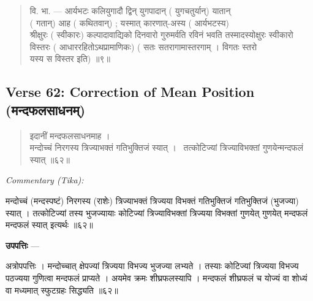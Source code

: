 \documentclass[11pt,a4paper]{article}
\newcommand{\dev}[1]{{\devanagarifont #1}}
\newcommand{\skt}[1]{{\devanagarifont\color{sktcolor} #1}}
\newenvironment{shloka}{%
  \begin{quote}%
  \smallskip%
  \devanagarifont\color{sktcolor}%
}{%
  \smallskip%
  \end{quote}%
}
\newenvironment{tika}{%
  \smallskip%
  \noindent\textit{Commentary (Tika):}\par%
  \smallskip%
  \hindifont\small%
}{%
  \par\smallskip%
}
\newenvironment{upapatti}{%
  \smallskip%
  \noindent\textbf{\devanagarifont उपपत्तिः} — \devanagarifont\small%
}{%
  \par\smallskip%
}
\begin{document}
\vspace{0.5cm}

\begin{shloka}
\skt{वि. भा. — आर्यभटः कलियुगादौ द्विन् युगपादान्} (\skt{युगचतुर्यान्}) \skt{यातान्}\\
(\skt{गतान्}) \skt{आह} (\skt{कथितवान्})\skt{; यस्मात् कारणात्-अस्य} (\skt{आर्यभटस्य})\\
\skt{श्रीक्षुरः} (\skt{स्वीकारः}) \skt{कल्पादावाद्यिको दिनवारो गुरुमर्वति रविनं भवति तस्मादस्योक्षुरः स्वीकारो}\\
\skt{विस्तरः} (\skt{आधाररहितोऽथप्रामाणिकः}) (\skt{सतः सतरागामास्तरगाम् । विगतः स्तरो}\\
\skt{यस्य स विस्तर इति}) ॥९॥
\end{shloka}

\subsection*{Verse 62: Correction of Mean Position (\dev{मन्दफलसाधनम्})}

\begin{shloka}
\skt{इदानीं मन्दफलसाधनमाह ।}\\[0.5em]
\skt{मन्दोच्चं निरगस्य त्रिज्याभक्तं गतिभुक्तिजं स्यात् ।}\
\skt{तत्कोटिज्यां त्रिज्याविभक्तां गुणयेन्मन्दफलं स्यात्} ॥६२॥
\end{shloka}

\vspace{0.3cm}
\begin{tika}
\skt{मन्दोच्चं} (मन्दस्पष्टं) \skt{निरगस्य} (राशेः) \skt{त्रिज्याभक्तं} त्रिज्यया विभक्तं \skt{गतिभुक्तिजं} गतिभुक्तिजं (भुजज्या) \skt{स्यात्} । \skt{तत्कोटिज्यां} तस्य भुजज्यायाः कोटिज्यां \skt{त्रिज्याविभक्तां} त्रिज्यया विभक्तां \skt{गुणयेत्} गुणयेत् \skt{मन्दफलं} मन्दफलं \skt{स्यात्} इत्यर्थः ॥६२॥
\end{tika}

\vspace{0.3cm}
\begin{upapatti}
\skt{अत्रोपपत्तिः} । मन्दोच्चात् क्षेपज्यां त्रिज्यया विभज्य भुजज्या लभ्यते । तस्याः कोटिज्यां त्रिज्यया विभज्य पठज्यया गुणित्वा मन्दफलं प्राप्यते । अयमेव क्रमः शीघ्रफलस्यापि । मन्दफलं शीघ्रफलं च योज्यं वा शोध्यं वा मध्यमात् स्फुटग्रहः सिद्ध्यति ॥६२॥
\end{upapatti}
\end{document}
